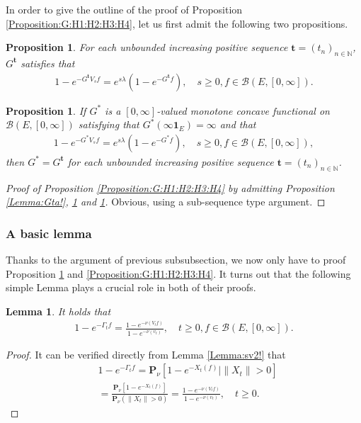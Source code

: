 \documentclass[12pt,a4paper]{amsart}
\numberwithin{equation}{section}
\theoremstyle{plain}
\newtheorem{lem}[thm]{Lemma}
\newtheorem{prop}[thm]{Proposition}
\theoremstyle{definition}
\theoremstyle{remark}
\begin{document}
In order to give the outline of the proof of Proposition \ref{Proposition:G:H1:H2:H3:H4}, let us first admit the following two propositions.
\begin{prop} \label{Proposition:Gtb:H1:H2:H3:H4} 
For each unbounded increasing positive sequence $\mathbf t = (t_n)_{n\in \mathbb N}$, $G^\mathbf t$ satisfies that 
\begin{align}
 1 - e^{-G^\mathbf t V_s f} 
 = e^{s\lambda} (1-e^{- G^\mathbf t f}), 
 \quad s\geq 0, f\in \mathcal B(E,[0,\infty]).
 \end{align}
\end{prop}
\begin{prop} \label{Proposition:G*:H1:H2:H3:H4} 
If $G^*$ is a $[0,\infty]$-valued monotone concave functional on $\mathcal B(E,[0,\infty])$ satisfying that $G^*(\infty \mathbf 1_E) = \infty$ and that
\begin{align}
 1 - e^{-G^* V_s f} 
 = e^{s\lambda} (1 - e^{- G^* f}),
 \quad s\geq 0, f\in \mathcal B(E,[0,\infty]),
 \end{align}
then $G^* = G^\mathbf t$ for each unbounded increasing positive sequence $\mathbf t = (t_n)_{n\in \mathbb N}$.
\end{prop}
\begin{proof}[Proof of Proposition \ref{Proposition:G:H1:H2:H3:H4} by admitting Proposition \ref{Lemma:Gta!}, \ref{Proposition:Gtb:H1:H2:H3:H4} and \ref{Proposition:G*:H1:H2:H3:H4}]
Obvious, using a sub-sequence type argument.
\end{proof}
\subsubsection{A basic lemma}
Thanks to the argument of previous subsubsection, we now only have to proof Proposition \ref{Proposition:Gtb:H1:H2:H3:H4} and \ref{Proposition:G:H1:H2:H3:H4}.
It turns out that the following simple Lemma plays a crucial role in both of their proofs.
\begin{lem} \label{Lemma:Gfnv!} 
It holds that
\begin{align}
 1 - e^{- \Gamma_t f} 
  = \frac{ 1 - e^{- \nu(V_tf)} }{ 1 - e^{- \nu(v_t)}},
  \quad t \geq 0, f\in \mathcal B(E,[0,\infty]).
 \end{align}
\end{lem}
\begin{proof}
It can be verified directly from Lemma \ref{Lemma:sv2!} that
\begin{align}
 & 1 - e^{- \Gamma_t f} 
   = \mathbf P_\nu [ 1 - e^{-X_t(f)} | \|X_t\|> 0] \\
  & = \frac{ \mathbf P_\nu [ 1 - e^{- X_t(f)}]}{ \mathbf P_\nu (\|X_t\| > 0)}
  = \frac{ 1 - e^{- \nu(V_tf)} }{ 1 - e^{- \nu(v_t)}},
  \quad t \geq 0.
 \end{align}
\end{proof}
\end{document}
